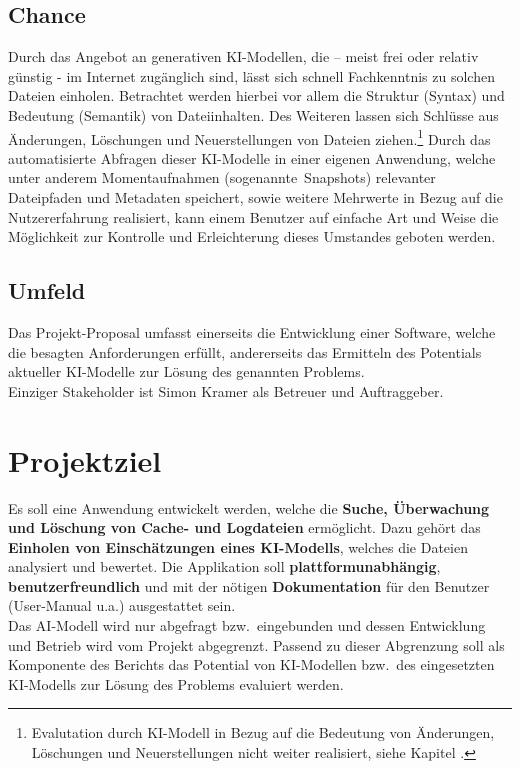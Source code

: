 \documentclass[a4paper,12pt]{report}
\begin{document}
    \subsection{Chance}\label{subsec:chance}
    Durch das Angebot an generativen KI-Modellen, die – meist frei oder relativ günstig - im
    Internet zugänglich sind, lässt sich schnell Fachkenntnis zu solchen Dateien einholen.
    Betrachtet werden hierbei vor allem die Struktur (Syntax) und Bedeutung (Semantik) von Dateiinhalten.
    Des Weiteren lassen sich Schlüsse aus Änderungen, Löschungen und Neuerstellungen von Dateien ziehen.\footnote{Evalutation durch KI-Modell in Bezug auf die Bedeutung von Änderungen, Löschungen und Neuerstellungen nicht weiter realisiert, siehe Kapitel .}
    Durch das automatisierte Abfragen dieser KI-Modelle in einer eigenen Anwendung,
    welche unter anderem Momentaufnahmen (sogenannte\ Snapshots) relevanter Dateipfaden und Metadaten speichert,
    sowie weitere Mehrwerte in Bezug auf die Nutzererfahrung realisiert, kann einem
    Benutzer auf einfache Art und Weise die Möglichkeit zur Kontrolle und Erleichterung dieses Umstandes
    geboten werden.

    \subsection{Umfeld}\label{subsec:stakeholder}
    Das Projekt-Proposal umfasst einerseits die Entwicklung einer Software, welche die besagten Anforderungen erfüllt,
    andererseits das Ermitteln des Potentials aktueller KI-Modelle zur Lösung des genannten Problems.\\
    Einziger Stakeholder ist Simon Kramer als Betreuer und Auftraggeber.\\


    \section{Projektziel}\label{sec:projektziel}
    Es soll eine Anwendung entwickelt werden, welche die \textbf{Suche, Überwachung und Löschung von Cache- und Logdateien} ermöglicht.
    Dazu gehört das \textbf{Einholen von Einschätzungen eines KI-Modells}, welches die Dateien analysiert und bewertet.
    Die Applikation soll \textbf{plattformunabhängig}, \textbf{benutzerfreundlich} und mit der nötigen \textbf{Dokumentation} für den Benutzer (User-Manual u.a.) ausgestattet sein.
    \\Das AI-Modell wird nur abgefragt bzw.\ eingebunden und dessen Entwicklung und Betrieb
    wird vom Projekt abgegrenzt.
    Passend zu dieser Abgrenzung soll als Komponente des Berichts das Potential von KI-Modellen bzw.\ des eingesetzten KI-Modells zur Lösung des Problems evaluiert werden.
\end{document}
